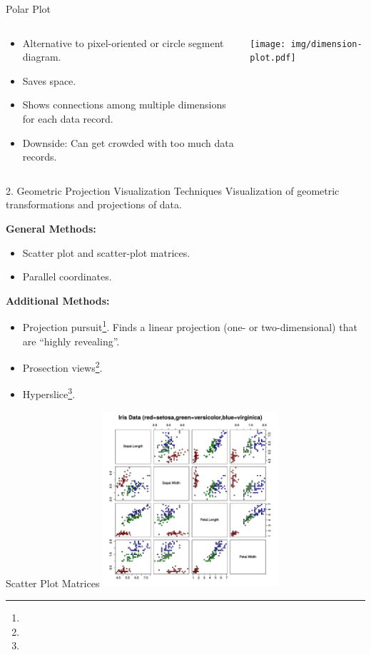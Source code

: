 \begin{frame}{Polar Plot}
  \begin{columns}[t]
    \begin{column}{0.5\textwidth}
      \begin{itemize}
      \item Alternative to pixel-oriented or circle segment diagram.
      \item Saves space.
      \item Shows connections among multiple dimensions for each data record.
      \item Downside: Can get crowded with too much data records.
      \end{itemize}
    \end{column}
    \begin{column}{0.5\textwidth}
      \vspace{-5em}
      \begin{center}
        \texttt{[image: img/dimension-plot.pdf]}
      \end{center}
    \end{column}
  \end{columns}
\end{frame}

\begin{frame}{2. Geometric Projection Visualization Techniques}
  Visualization of geometric transformations and projections of data.

  \textbf{General Methods:}
  \begin{itemize}
  \item Scatter plot and scatter-plot matrices.
  \item Parallel coordinates.
  \end{itemize}

  \textbf{Additional Methods:}
  \begin{itemize}
  \item Projection pursuit\footnote{}.
    Finds a linear projection (one- or two-dimensional) that are ``highly revealing''.
  \item Prosection views\footnote{}.
  \item Hyperslice\footnote{}.
  \end{itemize}
\end{frame}

\begin{frame}{Scatter Plot Matrices}
  \centering
  \includegraphics[height=6.5cm]{img/scatterplot_matrix.pdf}
\end{frame}

